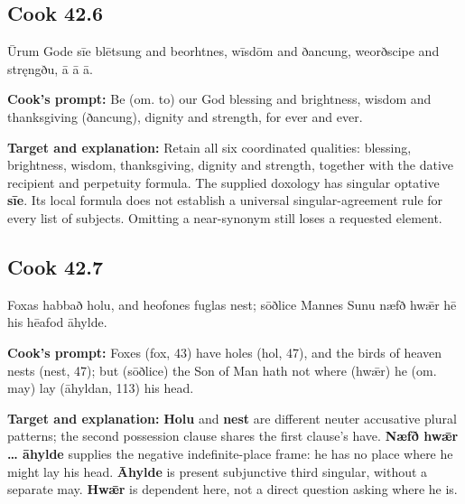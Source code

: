 \par\begin{minipage}{\linewidth}\raggedright
\subsection*{Cook 42.6}

Ūrum Gode sīe blētsung and beorhtnes, wīsdōm and ðancung, weorðscipe and stręngðu, ā ā ā.

\textbf{Cook's prompt:} Be (om. to) our God blessing and brightness, wisdom and thanksgiving (ðancung), dignity and strength, for ever and ever.

\textbf{Target and explanation:} Retain all six coordinated qualities: blessing, brightness, wisdom, thanksgiving, dignity and strength, together with the dative recipient and perpetuity formula. The supplied doxology has singular optative \textbf{sīe}. Its local formula does not establish a universal singular-agreement rule for every list of subjects. Omitting a near-synonym still loses a requested element.

\end{minipage}\par\addvspace{4pt}

\par\begin{minipage}{\linewidth}\raggedright
\subsection*{Cook 42.7}

Foxas habbað holu, and heofones fuglas nest; sōðlice Mannes Sunu næfð hwǣr hē his hēafod āhylde.

\textbf{Cook's prompt:} Foxes (fox, 43) have holes (hol, 47), and the birds of heaven nests (nest, 47); but (sōðlice) the Son of Man hath not where (hwǣr) he (om. may) lay (āhyldan, 113) his head.

\textbf{Target and explanation:} \textbf{Holu} and \textbf{nest} are different neuter accusative plural patterns; the second possession clause shares the first clause's have. \textbf{Næfð hwǣr … āhylde} supplies the negative indefinite-place frame: he has no place where he might lay his head. \textbf{Āhylde} is present subjunctive third singular, without a separate may. \textbf{Hwǣr} is dependent here, not a direct question asking where he is.

\end{minipage}\par\addvspace{4pt}

